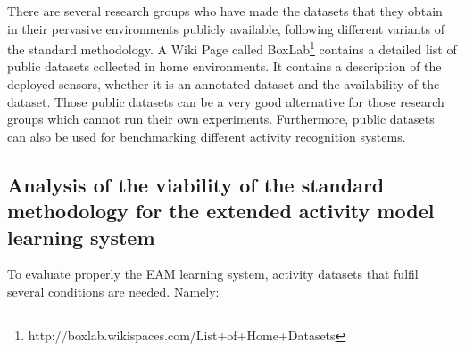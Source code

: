 There are several research groups who have made the datasets that they obtain in their pervasive environments publicly available, following different variants of the standard methodology. A Wiki Page called BoxLab\footnote{http://boxlab.wikispaces.com/List+of+Home+Datasets} contains a detailed list of public datasets collected in home environments. It contains a description of the deployed sensors, whether it is an annotated dataset and the availability of the dataset. Those public datasets can be a very good alternative for those research groups which cannot run their own experiments. Furthermore, public datasets can also be used for benchmarking different activity recognition systems.



\subsection{Analysis of the viability of the standard methodology for the extended activity model learning system}

To evaluate properly the EAM learning system, activity datasets that fulfil several conditions are needed. Namely:

